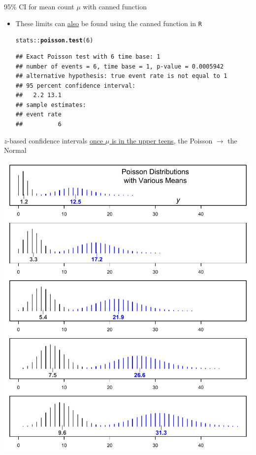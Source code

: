 \documentclass[10pt]{beamer}\usepackage[]{graphicx}\usepackage[]{color}
\makeatletter
\newcommand{\hlnum}[1]{\textcolor[rgb]{0.686,0.059,0.569}{#1}}%
\newcommand{\hlopt}[1]{\textcolor[rgb]{0,0,0}{#1}}%
\newcommand{\hlstd}[1]{\textcolor[rgb]{0.345,0.345,0.345}{#1}}%
\newcommand{\hlkwd}[1]{\textcolor[rgb]{0.737,0.353,0.396}{\textbf{#1}}}%
\newenvironment{kframe}{%
 \def\at@end@of@kframe{}%
 \ifinner\ifhmode%
  \def\at@end@of@kframe{\end{minipage}}%
  \begin{minipage}{\columnwidth}%
 \fi\fi%
 \def\FrameCommand##1{\hskip\@totalleftmargin \hskip-\fboxsep
 \colorbox{shadecolor}{##1}\hskip-\fboxsep
     \hskip-\linewidth \hskip-\@totalleftmargin \hskip\columnwidth}%
 \MakeFramed {\advance\hsize-\width
   \@totalleftmargin\z@ \linewidth\hsize
   \@setminipage}}%
 {\par\unskip\endMakeFramed%
 \at@end@of@kframe}
\newenvironment{knitrout}{}{} %
\makeatother
\begin{document}
\begin{frame}[fragile]{95\% CI for mean count $\mu$ with canned function}
	\begin{itemize}
		\setlength\itemsep{1em}
		\item These limits can \underline{also} be found using  the canned function in \texttt{R} 
		
\begin{knitrout}\tiny
{}\color{fgcolor}\begin{kframe}
\begin{alltt}
\hlstd{stats}\hlopt{::}\hlkwd{poisson.test}\hlstd{(}\hlnum{6}\hlstd{)}
\end{alltt}
\begin{verbatim}
## Exact Poisson test with 6 time base: 1 
## number of events = 6, time base = 1, p-value = 0.0005942
## alternative hypothesis: true event rate is not equal to 1 
## 95 percent confidence interval:
##   2.2 13.1 
## sample estimates:
## event rate 
##          6
\end{verbatim}
\end{kframe}
\end{knitrout}
		
	\end{itemize}
\end{frame}



\begin{frame}{$z$-based confidence intervals}
	\scriptsize
	\underline{once $\mu$ is in the upper teens}, the Poisson $\to$ the Normal
	
	\centering
	\includegraphics[scale=0.5]{Shapes.pdf}
	
\end{frame}
\end{document}
